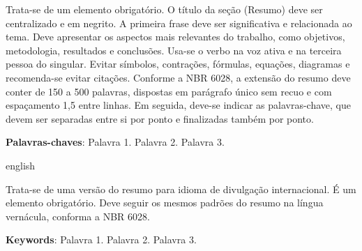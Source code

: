 
\begin{resumo}[Resumo] 
Trata-se de um elemento obrigatório. O título da seção (Resumo) deve ser centralizado e em negrito. A primeira frase deve ser significativa e relacionada ao tema. Deve apresentar os aspectos mais relevantes do trabalho, como objetivos, metodologia, resultados e conclusões. Usa-se o verbo na voz ativa e na terceira pessoa do singular. Evitar símbolos, contrações, fórmulas, equações, diagramas e recomenda-se evitar citações. Conforme a NBR 6028, a extensão do resumo deve conter de 150 a 500 palavras, dispostas em parágrafo único sem recuo e com espaçamento 1,5 entre linhas. Em seguida, deve-se indicar as palavras-chave, que devem ser separadas entre si por ponto e finalizadas também por ponto. 


 \vspace{\onelineskip}
    
 \noindent
 \textbf{Palavras-chaves}: Palavra 1. Palavra 2. Palavra 3.
\end{resumo}



\begin{resumo}[Abstract]
\begin{otherlanguage*}{english}

Trata-se de uma versão do resumo para idioma de divulgação internacional. É um elemento obrigatório. Deve seguir os mesmos padrões do resumo na língua vernácula, conforma a NBR 6028. 



   \vspace{\onelineskip} 
 
   \noindent 
   \textbf{Keywords}: Palavra 1. Palavra 2. Palavra 3.
 \end{otherlanguage*}
 \end{resumo}
